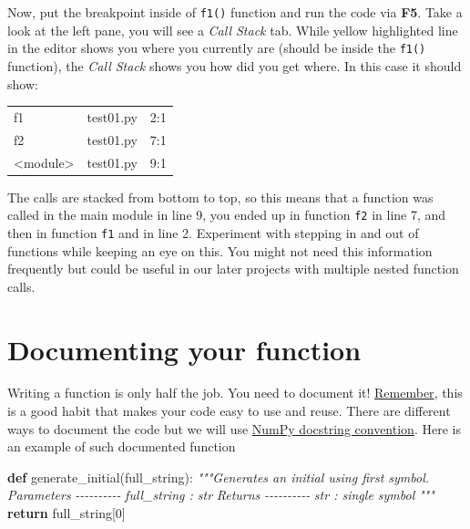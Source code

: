 \documentclass[
]{book}
\newenvironment{Shaded}{\begin{snugshade}}{\end{snugshade}}
\newcommand{\CommentTok}[1]{\textcolor[rgb]{0.56,0.35,0.01}{\textit{#1}}}
\newcommand{\ControlFlowTok}[1]{\textcolor[rgb]{0.13,0.29,0.53}{\textbf{#1}}}
\newcommand{\DecValTok}[1]{\textcolor[rgb]{0.00,0.00,0.81}{#1}}
\newcommand{\KeywordTok}[1]{\textcolor[rgb]{0.13,0.29,0.53}{\textbf{#1}}}
\newcommand{\NormalTok}[1]{#1}
\begin{document}
Now, put the breakpoint inside of \texttt{f1()} function and run the code via \textbf{F5}. Take a look at the left pane, you will see a \emph{Call Stack} tab. While yellow highlighted line in the editor shows you where you currently are (should be inside the \texttt{f1()} function), the \emph{Call Stack} shows you how did you get where. In this case it should show:

\begin{longtable}[]{@{}lll@{}}
\toprule\noalign{}
\endhead
\bottomrule\noalign{}
\endlastfoot
f1 & test01.py & 2:1 \\
f2 & test01.py & 7:1 \\
\textless module\textgreater{} & test01.py & 9:1 \\
\end{longtable}

The calls are stacked from bottom to top, so this means that a function was called in the main module in line 9, you ended up in function \texttt{f2} in line 7, and then in function \texttt{f1} and in line 2. Experiment with stepping in and out of functions while keeping an eye on this. You might not need this information frequently but could be useful in our later projects with multiple nested function calls.

\hypertarget{numpy-docstring}{%
\section{Documenting your function}\label{numpy-docstring}}

Writing a function is only half the job. You need to document it! \protect\hyperlink{programming-tips}{Remember}, this is a good habit that makes your code easy to use and reuse. There are different ways to document the code but we will use \href{https://numpydoc.readthedocs.io/en/latest/format.html\#docstring-standard}{NumPy docstring convention}. Here is an example of such documented function

\begin{Shaded}
\begin{Highlighting}[]
\KeywordTok{def}\NormalTok{ generate\_initial(full\_string):}
    \CommentTok{"""Generates an initial using first symbol.}
\CommentTok{    }
\CommentTok{    Parameters}
\CommentTok{    {-}{-}{-}{-}{-}{-}{-}{-}{-}{-}}
\CommentTok{    full\_string : str}
\CommentTok{    }
\CommentTok{    Returns}
\CommentTok{    {-}{-}{-}{-}{-}{-}{-}{-}{-}{-}}
\CommentTok{    str : single symbol}
\CommentTok{    """}
    \ControlFlowTok{return}\NormalTok{ full\_string[}\DecValTok{0}\NormalTok{]}
\end{Highlighting}
\end{Shaded}
\end{document}
